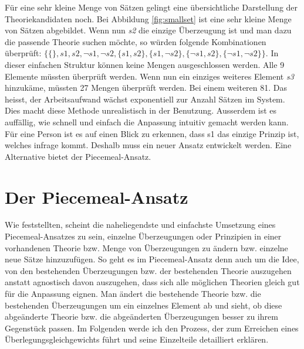 \documentclass{article}
\begin{document}
Für eine sehr kleine Menge von Sätzen gelingt eine übersichtliche Darstellung der Theoriekandidaten noch. Bei Abbildung \ref{fig:smallset} ist eine sehr kleine Menge von Sätzen abgebildet. Wenn nun \textit{s2} die einzige Überzeugung ist und man dazu die passende Theorie suchen möchte, so würden folgende Kombinationen überprüft: $\{\{\}, s1, s2, \neg s1, \neg s2, \{s1,s2\}, \{s1,\neg s2\}, \{\neg s1, s2 \}, \{\neg s1, \neg s2 \} \}$. In dieser einfachen Struktur können keine Mengen ausgeschlossen werden. Alle 9 Elemente müssten überprüft werden. Wenn nun ein einziges weiteres Element \textit{s3} hinzukäme, müssten 27 Mengen überprüft werden. Bei einem weiteren 81. Das heisst, der Arbeitsaufwand wächst exponentiell zur Anzahl Sätzen im System. Dies macht diese Methode unrealistisch in der Benutzung. Ausserdem ist es auffällig, wie schnell und einfach die Anpassung intuitiv gemacht werden kann. Für eine Person ist es auf einen Blick zu erkennen, dass s1 das einzige Prinzip ist, welches infrage kommt. Deshalb muss ein neuer Ansatz entwickelt werden. Eine Alternative bietet der Piecemeal-Ansatz.


\section{Der Piecemeal-Ansatz} \label{piecemealansatz}
Wie \cite[S.~461]{beisbart_making_2021} feststellten, scheint die naheliegendste und einfachste Umsetzung eines Piecemeal-Ansatzes zu sein, einzelne Überzeugungen oder Prinzipien in einer vorhandenen Theorie bzw. Menge von Überzeugungen zu ändern bzw. einzelne neue Sätze hinzuzufügen. So geht es im Piecemeal-Ansatz denn auch um die Idee, von den bestehenden Überzeugungen bzw. der bestehenden Theorie auszugehen anstatt agnostisch davon auszugehen, dass sich alle möglichen Theorien gleich gut für die Anpassung eignen. Man ändert die bestehende Theorie bzw. die bestehenden Überzeugungen um ein einzelnes Element ab und sieht, ob diese abgeänderte Theorie bzw. die abgeänderten Überzeugungen besser zu ihrem Gegenstück passen. Im Folgenden werde ich den Prozess, der zum Erreichen eines Überlegungsgleichgewichts führt und seine Einzelteile detailliert erklären.
\end{document}
